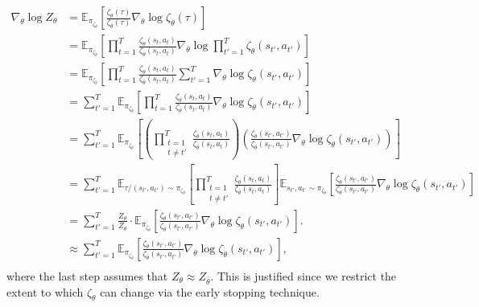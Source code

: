 \begin{equation}
\begin{split}
    \nabla_\theta \log Z_\theta &= 
    \mathbb{E}_{\pi_{\zeta_{\bar{\theta}}}}\left[\frac{\zeta_\theta(\tau)}{\zeta_{\bar{\theta}}(\tau)}\nabla_\theta \log \zeta_\theta(\tau)\right]\\
    &= \mathbb{E}_{\pi_{\zeta_{\bar{\theta}}}} \left[\prod_{t=1}^T\frac{\zeta_\theta(s_t,a_t)}{\zeta_{\bar{\theta}}(s_t,a_t)	}\nabla_\theta \log \prod_{t'=1}^T\zeta_\theta(s_{t'},a_{t'})\right]\\
    &= \mathbb{E}_{\pi_{\zeta_{\bar{\theta}}}} \left[\prod_{t=1}^T\frac{\zeta_\theta(s_t,a_t)}{\zeta_{\bar{\theta}}(s_t,a_t)	}\sum_{t'=1}^T\nabla_\theta \log \zeta_\theta(s_{t'},a_{t'})\right]\\
    &= \sum_{t'=1}^T\mathbb{E}_{\pi_{\zeta_{\bar{\theta}}}}\left[\prod_{t=1}^T\frac{\zeta_\theta(s_t,a_t)}{\zeta_{\bar{\theta}}(s_t,a_t)	}\nabla_\theta \log \zeta_\theta(s_{t'},a_{t'})\right]\\
    &= \sum_{t'=1}^T\mathbb{E}_{\pi_{\zeta_{\bar{\theta}}}}\left[\left(\prod_{\substack{t=1\\t\neq t'}}^{T}\frac{\zeta_\theta(s_t,a_t)}{\zeta_{\bar{\theta}}(s_t,a_t)}\right)\left(\frac{\zeta_\theta(s_{t'},a_{t'})}{\zeta_{\bar{\theta}}(s_{t'},a_{t'})}\nabla_\theta \log \zeta_\theta(s_{t'},a_{t'})\right)\right]\\
    &= \sum_{t'=1}^T\mathbb{E}_{\tau/(s_{t'},a_{t'})\sim\pi_{\zeta_{\bar{\theta}}}}\left[\prod_{\substack{t=1\\t\neq t'}}^{T}\frac{\zeta_\theta(s_t,a_t)}{\zeta_{\bar{\theta}}(s_t,a_t)}\right]\mathbb{E}_{s_{t'},a_{t'}\sim\pi_{\zeta_{\bar{\theta}}}}\left[\frac{\zeta_\theta(s_{t'},a_{t'})}{\zeta_{\bar{\theta}}(s_{t'},a_{t'})}\nabla_\theta \log \zeta_\theta(s_{t'},a_{t'})\right]\\
    &= \sum_{t'=1}^T \frac{Z_\theta}{Z_{\bar\theta}}\cdot \mathbb{E}_{\pi_{\zeta_{\bar{\theta}}}}\left[\frac{\zeta_\theta(s_{t'},a_{t'})}{\zeta_{\bar{\theta}}(s_{t'},a_{t'})}\nabla_\theta \log \zeta_\theta(s_{t'},a_{t'})\right].\\
    &\approx \sum_{t'=1}^T  \mathbb{E}_{\pi_{\zeta_{\bar{\theta}}}}\left[\frac{\zeta_\theta(s_{t'},a_{t'})}{\zeta_{\bar{\theta}}(s_{t'},a_{t'})}\nabla_\theta \log \zeta_\theta(s_{t'},a_{t'})\right],\\
\end{split}
\end{equation}
where the last step assumes that $Z_\theta \approx Z_{\bar\theta}$. This is justified since we restrict the extent to which $\zeta_\theta$ can change via the early stopping technique.

